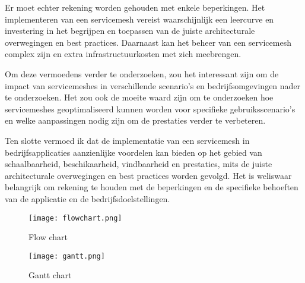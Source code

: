 Er moet echter rekening worden gehouden met enkele beperkingen. Het implementeren van een servicemesh vereist waarschijnlijk een leercurve en investering in het begrijpen en toepassen van de juiste architecturale overwegingen en best practices. Daarnaast kan het beheer van een servicemesh complex zijn en extra infrastructuurkosten met zich meebrengen.

Om deze vermoedens verder te onderzoeken, zou het interessant zijn om de impact van servicemeshes in verschillende scenario's en bedrijfsomgevingen nader te onderzoeken. Het zou ook de moeite waard zijn om te onderzoeken hoe servicemeshes geoptimaliseerd kunnen worden voor specifieke gebruiksscenario's en welke aanpassingen nodig zijn om de prestaties verder te verbeteren.

Ten slotte vermoed ik dat de implementatie van een servicemesh in bedrijfsapplicaties aanzienlijke voordelen kan bieden op het gebied van schaalbaarheid, beschikaarheid, vindbaarheid en prestaties, mits de juiste architecturale overwegingen en best practices worden gevolgd. Het is weliswaar belangrijk om rekening te houden met de beperkingen en de specifieke behoeften van de applicatie en de bedrijfsdoelstellingen.

\begin{figure*}[t]   
	\centering   
	\texttt{[image: flowchart.png]}  
	\caption{Flow chart}
	\label{fig:flowchart}				 
\end{figure*} 
\begin{figure*}[t]   
	\centering   
	\texttt{[image: gantt.png]}   
	\caption{Gantt chart}	
	\label{fig:gantt}	
\end{figure*} 